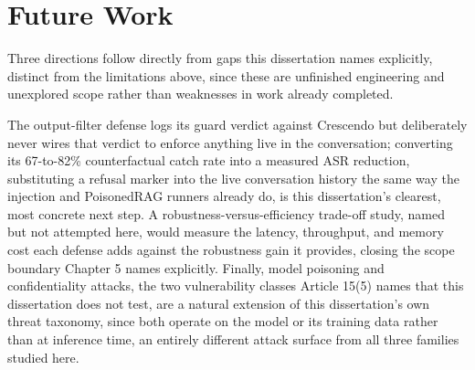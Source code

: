 \section{Future Work}

Three directions follow directly from gaps this dissertation names
explicitly, distinct from the limitations above, since these are
unfinished engineering and unexplored scope rather than weaknesses in
work already completed.

The output-filter defense logs its guard verdict against Crescendo but
deliberately never wires that verdict to enforce anything live in the
conversation; converting its 67-to-82\% counterfactual catch rate into a
measured ASR reduction, substituting a refusal marker into the live
conversation history the same way the injection and PoisonedRAG runners
already do, is this dissertation's clearest, most concrete next step. A
robustness-versus-efficiency trade-off study, named but not attempted
here, would measure the latency, throughput, and memory cost each
defense adds against the robustness gain it provides, closing the scope
boundary Chapter 5 names explicitly. Finally, model poisoning and
confidentiality attacks, the two vulnerability classes Article 15(5)
names that this dissertation does not test, are a natural extension of
this dissertation's own threat taxonomy, since both operate on the model
or its training data rather than at inference time, an entirely
different attack surface from all three families studied here.
